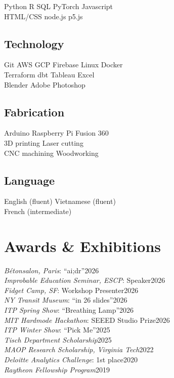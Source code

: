 \documentclass[]{deedy-resume-reversed}
\renewcommand{\sectionsep}{\vspace{4pt}}
\newcommand{\award}[2]{#1\hfill{\color{date}#2}\\}
\begin{document}
\begin{minipage}[t]{0.38\textwidth}


Python \textbullet{} R \textbullet{} SQL \textbullet{} PyTorch \textbullet{} Javascript \\ HTML/CSS \textbullet{} node.js \textbullet{} p5.js
\sectionsep

\subsection{Technology}
Git \textbullet{} AWS \textbullet{} GCP \textbullet{} Firebase \textbullet{} Linux \textbullet{} Docker \\ Terraform \textbullet{} dbt \textbullet{} Tableau \textbullet{} Excel \\ Blender \textbullet{} Adobe Photoshop
\sectionsep

\subsection{Fabrication}
Arduino \textbullet{} Raspberry Pi \textbullet{} Fusion 360 \\ 3D printing \textbullet{} Laser cutting \\ CNC machining \textbullet{} Woodworking
\sectionsep

\subsection{Language}
English (fluent) \textbullet{} Vietnamese (fluent) \\ French (intermediate)

\sectionsep{}

\section{Awards \& Exhibitions}
{\fontsize{9pt}{12pt}\selectfont
\award{\textit{Bétonsalon, Paris}: ``ai;dr''}{2026}
\award{\textit{Improbable Education Seminar, ESCP}: Speaker}{2026}
\award{\textit{Fidget Camp, SF}: Workshop Presenter}{2026}
\award{\textit{NY Transit Museum}: ``in 26 slides''}{2026}
\award{\textit{ITP Spring Show}: ``Breathing Lamp''}{2026}
\award{\textit{MIT Hardmode Hackathon}: SEEED Studio Prize}{2026}
\award{\textit{ITP Winter Show}: ``Pick Me''}{2025}
\award{\textit{Tisch Department Scholarship}}{2025}
\award{\textit{MAOP Research Scholarship, Virginia Tech}}{2022}
\award{\textit{Deloitte Analytics Challenge}: 1st place}{2020}
\award{\textit{Raytheon Fellowship Program}}{2019}
}



\end{minipage}
\end{document}
